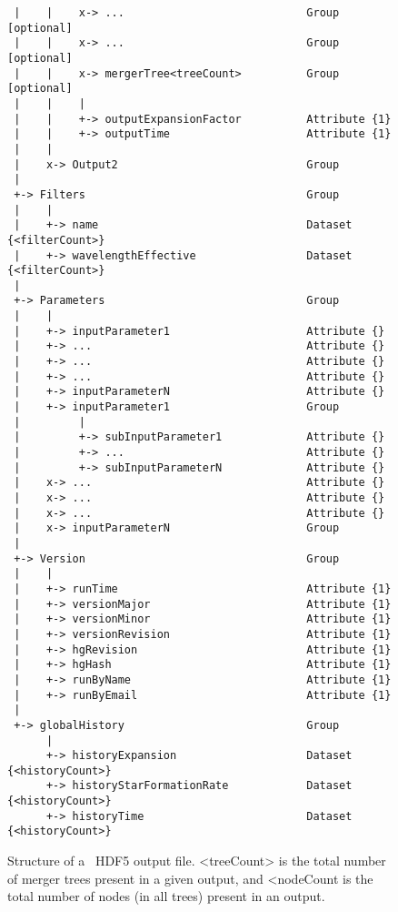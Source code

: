 \begin{figure}
\begin{center}
\begin{verbatim}
 |    |    x-> ...                            Group              [optional]
 |    |    x-> ...                            Group              [optional]
 |    |    x-> mergerTree<treeCount>          Group              [optional]
 |    |    |
 |    |    +-> outputExpansionFactor          Attribute {1}
 |    |    +-> outputTime                     Attribute {1}
 |    |
 |    x-> Output2                             Group
 |
 +-> Filters                                  Group
 |    |
 |    +-> name                                Dataset   {<filterCount>}
 |    +-> wavelengthEffective                 Dataset   {<filterCount>}
 |
 +-> Parameters                               Group
 |    |
 |    +-> inputParameter1                     Attribute {}
 |    +-> ...                                 Attribute {}
 |    +-> ...                                 Attribute {}
 |    +-> ...                                 Attribute {}
 |    +-> inputParameterN                     Attribute {}
 |    +-> inputParameter1                     Group
 |         |
 |         +-> subInputParameter1             Attribute {}
 |         +-> ...                            Attribute {}
 |         +-> subInputParameterN             Attribute {}
 |    x-> ...                                 Attribute {}
 |    x-> ...                                 Attribute {}
 |    x-> ...                                 Attribute {}
 |    x-> inputParameterN                     Group
 |
 +-> Version                                  Group
 |    |
 |    +-> runTime                             Attribute {1}
 |    +-> versionMajor                        Attribute {1}
 |    +-> versionMinor                        Attribute {1}
 |    +-> versionRevision                     Attribute {1}
 |    +-> hgRevision                          Attribute {1}
 |    +-> hgHash                              Attribute {1}
 |    +-> runByName                           Attribute {1}
 |    +-> runByEmail                          Attribute {1}
 |
 +-> globalHistory                            Group
      |
      +-> historyExpansion                    Dataset {<historyCount>}
      +-> historyStarFormationRate            Dataset {<historyCount>}
      +-> historyTime                         Dataset {<historyCount>}
\end{verbatim}
\end{center}
\caption{Structure of a \glc\ HDF5 output file. {\normalfont \ttfamily <treeCount>} is the total number of merger trees present in a given output, and {\normalfont \ttfamily <nodeCount} is the total number of nodes (in all trees) present in an output.}
\label{fig:glcOutputFileStructure}
\end{figure}

